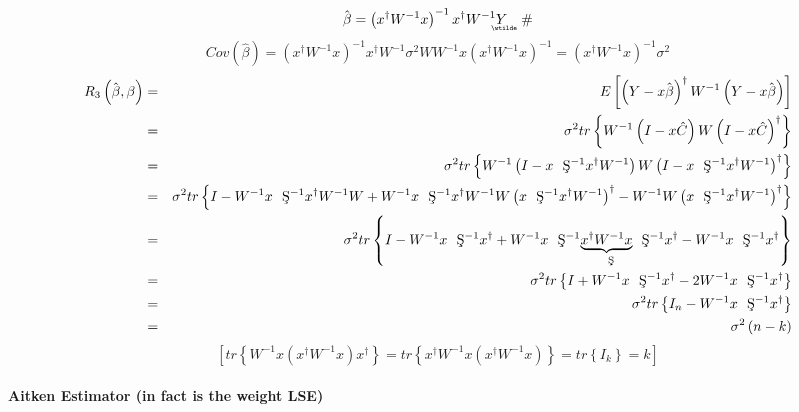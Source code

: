 \documentclass{article}
\begin{document}
\begin{equation*}
\therefore \hat{\beta}=\left( x^{\dagger }W^{-1}x\right) ^{-1}x^{\dagger
}W^{-1}%
\underaccent{\wtilde}{Y}%
\quad \#
\end{equation*}%
\begin{equation*}
Cov\left( \hat{\beta}\right) =\left( x^{\dagger }W^{-1}x\right)
^{-1}x^{\dagger }W^{-1}\sigma ^{2}WW^{-1}x\left( x^{\dagger }W^{-1}x\right)
^{-1}=\left( x^{\dagger }W^{-1}x\right) ^{-1}\sigma ^{2}
\end{equation*}%
\begin{eqnarray*}
R_{3}\left( \hat{\beta},\beta \right)  &=&E\left[ \left( Y-x\hat{\beta}%
\right) ^{\dagger }W^{-1}\left( Y-x\hat{\beta}\right) \right]  \\
&=&\sigma ^{2}tr\left\{ W^{-1}\left( I-x\hat{C}\right) W\left( I-x\hat{C}%
\right) ^{\dagger }\right\}  \\
&=&\sigma ^{2}tr\left\{ W^{-1}\left( I-x\text{\c{S}}^{-1}x^{\dagger
}W^{-1}\right) W\left( I-x\text{\c{S}}^{-1}x^{\dagger }W^{-1}\right)
^{\dagger }\right\}  \\
&=&\sigma ^{2}tr\left\{ I-W^{-1}x\text{\c{S}}^{-1}x^{\dagger }W^{-1}W+W^{-1}x%
\text{\c{S}}^{-1}x^{\dagger }W^{-1}W\left( x\text{\c{S}}^{-1}x^{\dagger
}W^{-1}\right) ^{\dagger }-W^{-1}W\left( x\text{\c{S}}^{-1}x^{\dagger
}W^{-1}\right) ^{\dagger }\right\}  \\
&=&\sigma ^{2}tr\left\{ I-W^{-1}x\text{\c{S}}^{-1}x^{\dagger }+W^{-1}x\text{%
\c{S}}^{-1}\underset{\text{\c{S}}}{\underbrace{x^{\dagger }W^{-1}x}}\text{\c{%
S}}^{-1}x^{\dagger }-W^{-1}x\text{\c{S}}^{-1}x^{\dagger }\right\}  \\
&=&\sigma ^{2}tr\left\{ I+W^{-1}x\text{\c{S}}^{-1}x^{\dagger }-2W^{-1}x\text{%
\c{S}}^{-1}x^{\dagger }\right\}  \\
&=&\sigma ^{2}tr\left\{ I_{n}-W^{-1}x\text{\c{S}}^{-1}x^{\dagger }\right\} 
\\
&=&\sigma ^{2}\left( n-k\right) 
\end{eqnarray*}%
\begin{equation*}
\left[ tr\left\{ W^{-1}x\left( x^{\dagger }W^{-1}x\right) x^{\dagger
}\right\} =tr\left\{ x^{\dagger }W^{-1}x\left( x^{\dagger }W^{-1}x\right)
\right\} =tr\left\{ I_{k}\right\} =k\right] 
\end{equation*}

\bigskip 

\bigskip 

\paragraph{Aitken Estimator (in fact is the weight LSE)}
\end{document}
